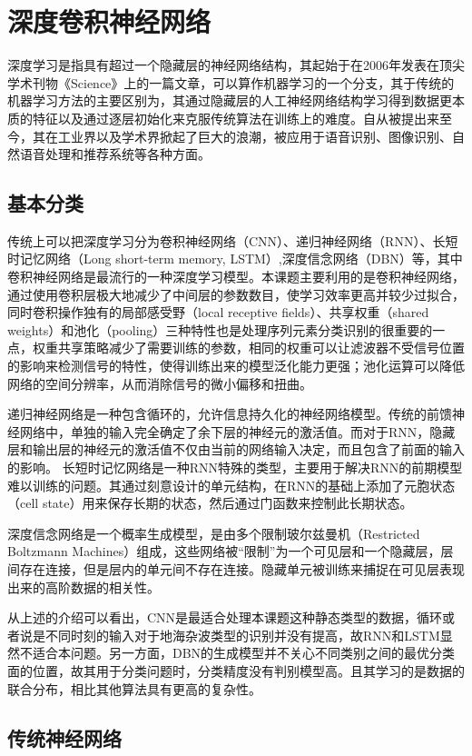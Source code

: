 \chapter{深度卷积神经网络}

深度学习是指具有超过一个隐藏层的神经网络结构，其起始于在2006年发表在顶尖学术刊物《Science》上的一篇文章，可以算作机器学习的一个分支，其于传统的机器学习方法的主要区别为，其通过隐藏层的人工神经网络结构学习得到数据更本质的特征以及通过逐层初始化来克服传统算法在训练上的难度。自从被提出来至今，其在工业界以及学术界掀起了巨大的浪潮，被应用于语音识别、图像识别、自然语音处理和推荐系统等各种方面。

\section{基本分类}
传统上可以把深度学习分为卷积神经网络（CNN）、递归神经网络（RNN）、长短时记忆网络（Long short-term memory, LSTM）,深度信念网络（DBN）等，其中卷积神经网络是最流行的一种深度学习模型。本课题主要利用的是卷积神经网络，通过使用卷积层极大地减少了中间层的参数数目，使学习效率更高并较少过拟合，同时卷积操作独有的局部感受野（local receptive fields）、共享权重（shared weights）和池化（pooling）三种特性也是处理序列元素分类识别的很重要的一点，权重共享策略减少了需要训练的参数，相同的权重可以让滤波器不受信号位置的影响来检测信号的特性，使得训练出来的模型泛化能力更强；池化运算可以降低网络的空间分辨率，从而消除信号的微小偏移和扭曲。

递归神经网络是一种包含循环的，允许信息持久化的神经网络模型。传统的前馈神经网络中，单独的输入完全确定了余下层的神经元的激活值。而对于RNN，隐藏层和输出层的神经元的激活值不仅由当前的网络输入决定，而且包含了前面的输入的影响。
长短时记忆网络是一种RNN特殊的类型，主要用于解决RNN的前期模型难以训练的问题。其通过刻意设计的单元结构，在RNN的基础上添加了元胞状态（cell state）用来保存长期的状态，然后通过门函数来控制此长期状态。

深度信念网络是一个概率生成模型，是由多个限制玻尔兹曼机（Restricted Boltzmann Machines）组成，这些网络被“限制”为一个可见层和一个隐藏层，层间存在连接，但是层内的单元间不存在连接。隐藏单元被训练来捕捉在可见层表现出来的高阶数据的相关性。

从上述的介绍可以看出，CNN是最适合处理本课题这种静态类型的数据，循环或者说是不同时刻的输入对于地海杂波类型的识别并没有提高，故RNN和LSTM显然不适合本问题。另一方面，DBN的生成模型并不关心不同类别之间的最优分类面的位置，故其用于分类问题时，分类精度没有判别模型高。且其学习的是数据的联合分布，相比其他算法具有更高的复杂性。

\section{传统神经网络}

